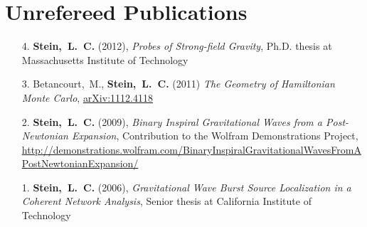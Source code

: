 \section{\sc Unrefereed Publications}
\begin{enumerate}
\item[{4.}] {\bf Stein,~L.~C.} (2012), {\it Probes of Strong-field Gravity}, Ph.D. thesis at Massachusetts Institute of Technology
\item[{3.}] Betancourt,~M., {\bf Stein,~L.~C.} (2011) {\it The
    Geometry of Hamiltonian Monte Carlo}, \href{http://arxiv.org/abs/1112.4118}{arXiv:1112.4118}
\item[{2.}] {\bf Stein,~L.~C.} (2009), {\it Binary Inspiral
    Gravitational Waves from a Post-Newtonian Expansion}, Contribution
  to the Wolfram Demonstrations Project, \url{http://demonstrations.wolfram.com/BinaryInspiralGravitationalWavesFromAPostNewtonianExpansion/}
\item[{1.}] {\bf Stein,~L.~C.} (2006), {\it Gravitational Wave Burst Source Localization in a Coherent Network Analysis}, Senior thesis at California Institute of Technology
\end{enumerate}
